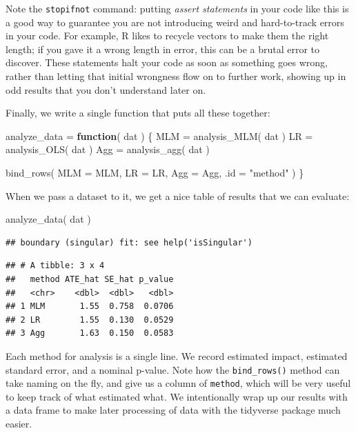 \documentclass[
]{book}
\newenvironment{Shaded}{\begin{snugshade}}{\end{snugshade}}
\newcommand{\AttributeTok}[1]{\textcolor[rgb]{0.77,0.63,0.00}{#1}}
\newcommand{\ControlFlowTok}[1]{\textcolor[rgb]{0.13,0.29,0.53}{\textbf{#1}}}
\newcommand{\FunctionTok}[1]{\textcolor[rgb]{0.00,0.00,0.00}{#1}}
\newcommand{\NormalTok}[1]{#1}
\newcommand{\OtherTok}[1]{\textcolor[rgb]{0.56,0.35,0.01}{#1}}
\newcommand{\StringTok}[1]{\textcolor[rgb]{0.31,0.60,0.02}{#1}}
\begin{document}
Note the \texttt{stopifnot} command: putting \emph{assert statements} in your code like this is a good way to guarantee you are not introducing weird and hard-to-track errors in your code.
For example, R likes to recycle vectors to make them the right length; if you gave it a wrong length in error, this can be a brutal error to discover.
These statements halt your code as soon as something goes wrong, rather than letting that initial wrongness flow on to further work, showing up in odd results that you don't understand later on.

Finally, we write a single function that puts all these together:

\begin{Shaded}
\begin{Highlighting}[]
\NormalTok{analyze\_data }\OtherTok{=} \ControlFlowTok{function}\NormalTok{( dat ) \{}
\NormalTok{  MLM }\OtherTok{=} \FunctionTok{analysis\_MLM}\NormalTok{( dat )}
\NormalTok{  LR }\OtherTok{=} \FunctionTok{analysis\_OLS}\NormalTok{( dat )}
\NormalTok{  Agg }\OtherTok{=} \FunctionTok{analysis\_agg}\NormalTok{( dat )}
  
  \FunctionTok{bind\_rows}\NormalTok{( }\AttributeTok{MLM =}\NormalTok{ MLM, }\AttributeTok{LR =}\NormalTok{ LR, }\AttributeTok{Agg =}\NormalTok{ Agg,}
             \AttributeTok{.id =} \StringTok{"method"}\NormalTok{ )}
\NormalTok{\}}
\end{Highlighting}
\end{Shaded}

When we pass a dataset to it, we get a nice table of results that we can evaluate:

\begin{Shaded}
\begin{Highlighting}[]
\FunctionTok{analyze\_data}\NormalTok{( dat )}
\end{Highlighting}
\end{Shaded}

\begin{verbatim}
## boundary (singular) fit: see help('isSingular')
\end{verbatim}

\begin{verbatim}
## # A tibble: 3 x 4
##   method ATE_hat SE_hat p_value
##   <chr>    <dbl>  <dbl>   <dbl>
## 1 MLM       1.55  0.758  0.0706
## 2 LR        1.55  0.130  0.0529
## 3 Agg       1.63  0.150  0.0583
\end{verbatim}

Each method for analysis is a single line. We record estimated impact, estimated standard error, and a nominal p-value.
Note how the \texttt{bind\_rows()} method can take naming on the fly, and give us a column of \texttt{method}, which will be very useful to keep track of what estimated what.
We intentionally wrap up our results with a data frame to make later processing of data with the tidyverse package much easier.
\end{document}
